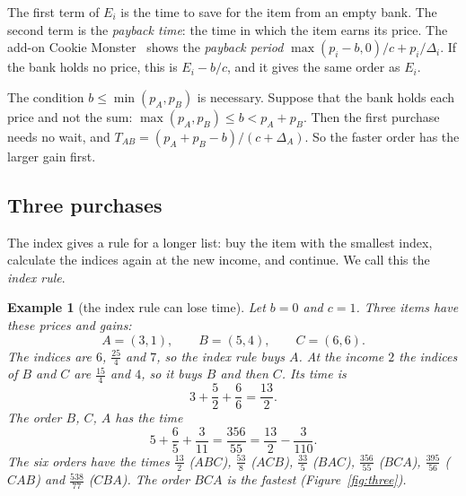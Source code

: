 \documentclass[11pt]{article}
\theoremstyle{boxed}
\newtheorem{example}[theorem]{Example}
\begin{document}
The first term of $E_i$ is the time to save for the item from an empty bank. The second term is
the \emph{payback time}: the time in which the item earns its price. The add-on Cookie
Monster~\cite{CM} shows the \emph{payback period} $\max(p_i-b,0)/c+p_i/\Delta_i$. If the bank
holds no price, this is $E_i-b/c$, and it gives the same order as $E_i$.

The condition $b\le\min(p_A,p_B)$ is necessary. Suppose that the bank holds each price and not
the sum: $\max(p_A,p_B)\le b<p_A+p_B$. Then the first purchase needs no wait, and
$T_{AB}=(p_A+p_B-b)/(c+\Delta_A)$. So the faster order has the larger gain first.

\subsection{Three purchases}

The index gives a rule for a longer list: buy the item with the smallest index, calculate the
indices again at the new income, and continue. We call this the \emph{index rule}.

\begin{example}[the index rule can lose time]\label{ex:three}
Let $b=0$ and $c=1$. Three items have these prices and gains:
\[
  A=(3,1),\qquad B=(5,4),\qquad C=(6,6).
\]
The indices are $6$, $\frac{25}{4}$ and $7$, so the index rule buys $A$. At the income $2$ the
indices of $B$ and $C$ are $\frac{15}{4}$ and $4$, so it buys $B$ and then $C$. Its time is
\[
  3+\frac52+\frac66=\frac{13}{2}.
\]
The order $B$, $C$, $A$ has the time
\[
  5+\frac65+\frac3{11}=\frac{356}{55}=\frac{13}{2}-\frac{3}{110}.
\]
The six orders have the times
$\frac{13}{2}$ ($ABC$), $\frac{53}{8}$ ($ACB$), $\frac{33}{5}$ ($BAC$), $\frac{356}{55}$
($BCA$), $\frac{395}{56}$ ($CAB$) and $\frac{538}{77}$ ($CBA$). The order $BCA$ is the fastest
(Figure~\ref{fig:three}).
\end{example}
\end{document}
